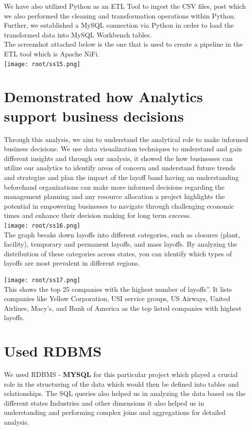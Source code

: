 {We have also utilized Python as an ETL Tool to ingest the CSV files, post which we also performed the cleaning and transformation operations within Python. Further, we established a MySQL connection via Python in order to load the transformed data into MySQL Workbench tables.}\\
{The screenshot attached below is the one that is used to create a pipeline in the ETL tool which is Apache NiFi.}\\

\texttt{[image: root/ss15.png]}~\\

\section{\Large\textbf{Demonstrated how Analytics support business decisions}}
{Through this analysis, we aim to understand the analytical role to make informed business decisions. We use data visualization techniques to understand and gain different insights and through our analysis, it showed the how businesses can utilize our analytics to identify areas of concern and understand future trends and strategize  and plan the impact of the layoff band having an understanding beforehand organizations can make more informed decisions regarding the management planning and any resource allocation a project highlights the  potential in empowering businesses to navigate through challenging economic times and enhance their decision making for long term success.}\\

\texttt{[image: root/ss16.png]}~\\

{The graph breaks down layoffs into different categories, such as closures (plant, facility), temporary and permanent layoffs, and mass layoffs. By analyzing the distribution of these categories across states, you can identify which types of layoffs are most prevalent in different regions.}

\texttt{[image: root/ss17.png]}~\\
{This shows the top 25 companies with the highest number of layoffs”. It lists companies like Yellow Corporation, USI service groups, US Airways, United Airlines, Macy’s, and Bank of America as the top listed companies with highest layoffs.}

\section{\Large\textbf{Used RDBMS}}
{We used  RDBMS - \textbf{MYSQL} for this particular project which played a crucial role in the structuring of the data which would then be defined into tables and relationships. The  SQL queries also helped us in analyzing the data based on the different states Industries and other dimensions it also helped us in understanding and performing complex joins and aggregations for detailed analysis.}\\

